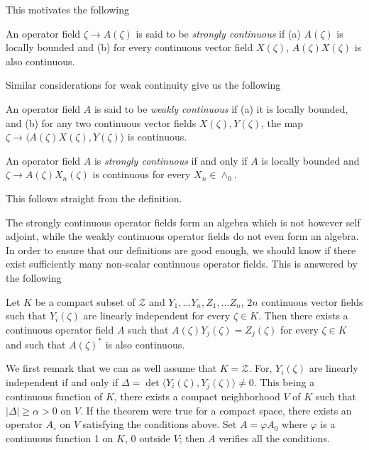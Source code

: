 This motivates the following

\begin{defi*} 
An operator field $\zeta \to A(\zeta)$ is said to be {\em strongly
  continuous}\pageoriginale 
if (a) $A(\zeta)$ is locally bounded and (b) for every
continuous vector field $X(\zeta)$, $A(\zeta) X (\zeta)$ is also
continuous. 
\end{defi*}

Similar considerations for weak continuity give us the following 
\begin{defi*}
An operator field $A$ is said to be {\em weakly continuous} if (a) it
is locally bounded, and (b) for any two continuous vector fields 
 $X(\zeta),Y(\zeta)$, the map $\zeta \to \langle
A(\zeta)X(\zeta),Y(\zeta) \rangle$ is continuous.  
\end{defi*}
  
\begin{proposition}\label{partIII-chap1-prop5} %
An operator field $A$ is {\em strongly continuous} if and only if $A$ is
locally bounded and $\zeta \to A (\zeta)X_n(\zeta)$ is continuous for
every  $X_n \in \wedge_0$. 
\end{proposition}
 
This follows straight from the definition.
 
The strongly continuous operator fields form an algebra which is not
however self adjoint, while the weakly continuous operator fields  do
not even form an algebra. In order to ensure that our definitions are
good  enough, we should know if there exist sufficiently many
non-scalar continuous operator fields. This is answered by the
following 
 
\setcounter{thm}{0}
\begin{thm}\label{partIII-chap1-thm1}%
{Let} $K$ {be a compact subset of} $\mathcal{Z}$ {and}
$Y_1,\ldots Y_n, Z_1,\ldots Z_n$,  $2n$  {continuous vector fields
  such that} $Y_i(\zeta)$ {\rm are linearly independent for every}
$\zeta \in K.$  {Then there exists a continuous operator field}
$A$ {such that} $A (\zeta)Y_j(\zeta)=Z_j(\zeta)$ {for every}
$\zeta \in K$ {and such that} $A(\zeta)^*$ {is also
  continuous}. 
\end{thm}

We first remark that we can as well assume that $K=\mathcal{Z}$. For,
$Y_i(\zeta)$ are linearly independent if and only if $\Delta= \det
\langle Y_i(\zeta),Y_j(\zeta) \rangle \neq 0$. This being a continuous
function of $K$, there exists a compact neighborhood $V$ of $K$ such
that $| \Delta| \ge \alpha >0$ on $V$.  If the theorem were true
for a compact space, there exists an operator $A_\circ$ on $V$
satisfying the conditions above.\pageoriginale  
Set $A=\varphi A_0$ where $\varphi$ is a
continuous function 1 on $K$, $0$ outside $V$; then $A$ verifies all
the conditions. 
 
